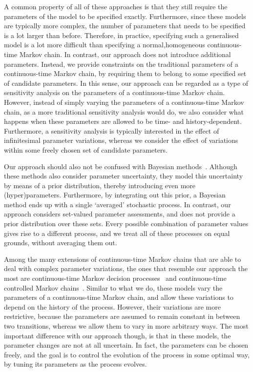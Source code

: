 \documentclass[10pt,a4paper]{paper}
\theoremstyle{definition}
\begin{document}
A common property of all of these approaches is that they still require the parameters of the model to be specified exactly. Furthermore, since these models are typically more complex, the number of parameters that needs to be specified is a lot larger than before. Therefore, in practice, specifying such a generalised model is a lot more difficult than specifying a normal,homogeneous continuous-time Markov chain.
In contrast, our approach does not introduce additional parameters. Instead, we provide constraints on the traditional parameters of a continuous-time Markov chain, by requiring them to belong to some specified set of candidate parameters.
In this sense, our approach can be regarded as a type of sensitivity analysis on the parameters of a continuous-time Markov chain. However, instead of simply varying the parameters of a continuous-time Markov chain, as a more traditional sensitivity analysis would do, we also consider what happens when these parameters are allowed to be time- and history-dependent. Furthermore, a sensitivity analysis is typically interested in the effect of infinitesimal parameter variations, whereas we consider the effect of variations within some freely chosen set of candidate parameters.

Our approach should also not be confused with Bayesian methods~\cite{insua2012bayesian}. Although these methods also consider parameter uncertainty, they model this uncertainty by means of a prior distribution, thereby introducing even more (hyper)parameters. Furthermore, by integrating out this prior, a Bayesian method ends up with a single `averaged' stochastic process. In contrast, our approach considers set-valued parameter assessments, and does not provide a prior distribution over these sets. Every possible combination of parameter values gives rise to a different process, and we treat all of these processes on equal grounds, without averaging them out.

Among the many extensions of continuous-time Markov chains that are able to deal with complex parameter variations, the ones that resemble our approach the most are continuous-time Markov decision processes~\cite{Xianping:2009} and continuous-time controlled Markov chains~\cite{guo2003}. Similar to what we do, these models vary the parameters of a continuous-time Markov chain, and allow these variations to depend on the history of the process. However, their variations are more restrictive, because the parameters are assumed to remain constant in between two transitions, whereas we allow them to vary in more arbitrary ways. The most important difference with our approach though, is that in these models, the parameter changes are not at all uncertain. In fact, the parameters can be chosen freely, and the goal is to control the evolution of the process in some optimal way, by tuning its parameters as the process evolves.
\end{document}
